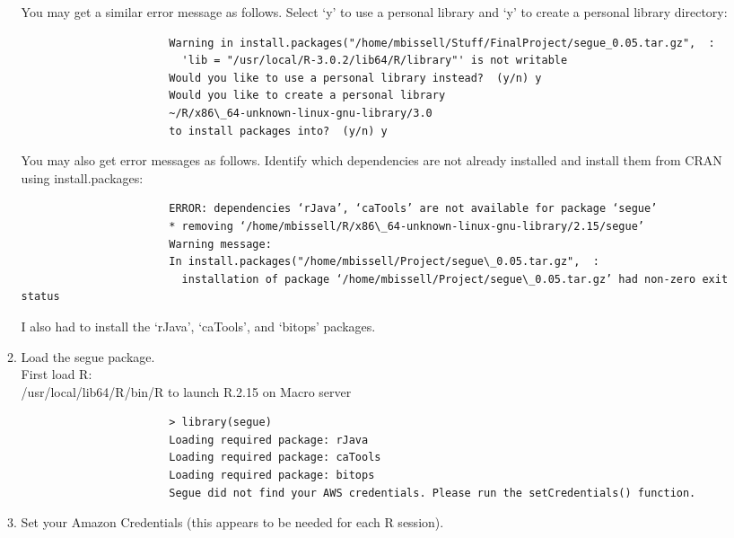 \documentclass[a4paper, 11pt]{report}
\begin{document}
\begin{enumerate}
\begin{enumerate}
					You may get a similar error message as follows.  Select `y' to use a personal library and `y' to create a personal library directory: 
					
					\footnotesize\begin{verbatim}
					   Warning in install.packages("/home/mbissell/Stuff/FinalProject/segue_0.05.tar.gz",  :
					     'lib = "/usr/local/R-3.0.2/lib64/R/library"' is not writable
					   Would you like to use a personal library instead?  (y/n) y
					   Would you like to create a personal library
					   ~/R/x86\_64-unknown-linux-gnu-library/3.0
					   to install packages into?  (y/n) y
					\end{verbatim}\normalsize
					
					You may also get error messages as follows.  Identify which dependencies are not already installed and install them from CRAN using install.packages: 
					
					\footnotesize\begin{verbatim}
					   ERROR: dependencies ‘rJava’, ‘caTools’ are not available for package ‘segue’
					   * removing ‘/home/mbissell/R/x86\_64-unknown-linux-gnu-library/2.15/segue’ 
					   Warning message: 
					   In install.packages("/home/mbissell/Project/segue\_0.05.tar.gz",  : 
					     installation of package ‘/home/mbissell/Project/segue\_0.05.tar.gz’ had non-zero exit status 			
					\end{verbatim}\normalsize
					
					I also had to install the `rJava', `caTools', and `bitops' packages. \\
					
				\item Load the segue package. \\
				
					First load R: \\
					/usr/local/lib64/R/bin/R to launch R.2.15 on Macro server 
					
					\footnotesize\begin{verbatim}
					   > library(segue)
					   Loading required package: rJava 
					   Loading required package: caTools
					   Loading required package: bitops
					   Segue did not find your AWS credentials. Please run the setCredentials() function.
					\end{verbatim}\normalsize
					
				\item Set your Amazon Credentials (this appears to be needed for each R session). \\
						

\end{enumerate}
\end{enumerate}
\end{document}
